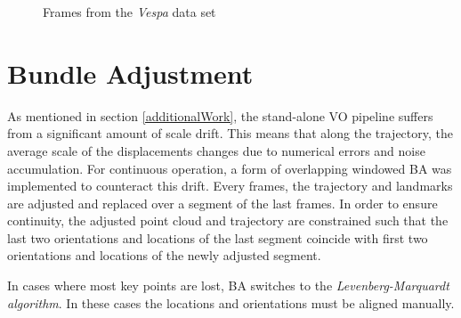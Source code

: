 \begin{figure}[htp]
\hfill
{}\hfill
{}
\caption{Frames from the \emph{Vespa} data set}
\end{figure}

\section{Bundle Adjustment}
\label{bundle adjustment}
As mentioned in section \ref{additionalWork}, the stand-alone VO pipeline suffers from a significant amount of scale drift. 
This means that along the trajectory, the average scale of the displacements changes due to numerical errors and noise accumulation. 
For continuous operation, a form of overlapping windowed BA was implemented to counteract this drift.  
Every \baEveryNthFrame frames, the trajectory and landmarks are adjusted and replaced over a segment of the last \baReplaceframes frames. 
In order to ensure continuity, the adjusted point cloud and trajectory are constrained such that the last two orientations and locations of the last segment coincide with first two orientations and locations of the newly adjusted segment. \par
In cases where most key points are lost, BA switches to the \emph{Levenberg-Marquardt algorithm}. In these cases the locations and orientations must be aligned manually.

